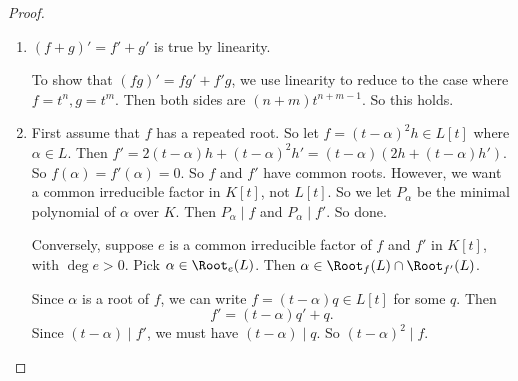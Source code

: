 \documentclass[a4paper]{article}
\begin{document}
\begin{proof}\leavevmode
  \begin{enumerate}
    \item $(f + g)' = f' + g'$ is true by linearity.

      To show that $(fg)' = fg' + f'g$, we use linearity to reduce to the case where $f = t^n, g = t^m$. Then both sides are $(n + m) t^{n + m - 1}$. So this holds.
    \item First assume that $f$ has a repeated root. So let $f = (t - \alpha)^2 h \in L[t]$ where $\alpha \in L$. Then $f' = 2(t - \alpha)h + (t - \alpha)^2 h' = (t - \alpha)(2h + (t - \alpha)h')$. So $f(\alpha) = f'(\alpha) = 0$. So $f$ and $f'$ have common roots. However, we want a common irreducible factor in $K[t]$, not $L[t]$. So we let $P_\alpha$ be the minimal polynomial of $\alpha$ over $K$. Then $P_\alpha \mid f$ and $P_\alpha \mid f'$. So done.

    Conversely, suppose $e$ is a common irreducible factor of $f$ and $f'$ in $K[t]$, with $\deg e > 0$. Pick $\alpha \in \Root_e(L)$. Then $\alpha \in \Root_f(L) \cap \Root_{f'}(L)$.

      Since $\alpha$ is a root of $f$, we can write $f = (t - \alpha)q \in L[t]$ for some $q$. Then
      \[
        f' = (t - \alpha) q' + q.
      \]
      Since $(t - \alpha) \mid f'$, we must have $(t - \alpha) \mid q$. So $(t - \alpha)^2 \mid f$.
  \end{enumerate}
\end{proof}
\end{document}
